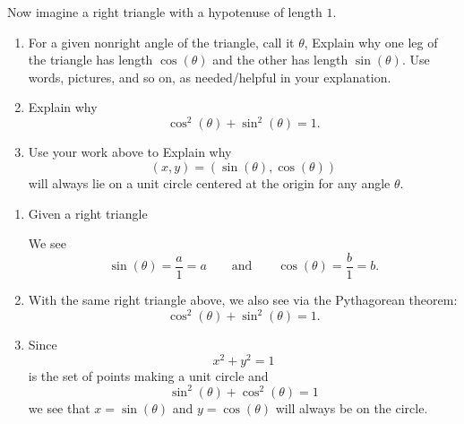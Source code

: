 \documentclass[noauthor,nooutcomes,handout]{ximera}
\begin{document}
\begin{question}
  Now imagine a right triangle with a hypotenuse of length $1$. 
  \begin{enumerate}
  \item For a given nonright angle of the triangle, call it $\theta$,
    Explain why one leg of the triangle has length $\cos(\theta)$ and
    the other has length $\sin(\theta)$.  Use words, pictures, and so
    on, as needed/helpful in your explanation.
  \item Explain why
    \[
    \cos^2(\theta) + \sin^2(\theta) = 1.
    \]
  \item Use your work above to Explain why
    \[
    (x,y) = (\sin(\theta),\cos(\theta))
    \]
    will always lie on a unit circle centered at the origin for any
    angle $\theta$.
  \end{enumerate}
  \begin{freeResponse}
    \begin{enumerate}
    \item Given a right triangle
    \begin{center}
    \end{center}
    We see
    \[
    \sin(\theta) = \frac{a}{1} = a\qquad \text{and}\qquad \cos(\theta) = \frac{b}{1} = b.
    \]
  \item With the same right triangle above, we also see via the Pythagorean theorem:
    \[
    \cos^2(\theta) + \sin^2(\theta) = 1.
    \]
  \item Since
    \[
    x^2+y^2=1
    \]
    is the set of points making a unit circle and
    \[
    \sin^2(\theta) + \cos^2(\theta) = 1
    \]
    we see that $x=\sin(\theta)$ and $y=\cos(\theta)$ will always be
    on the circle.
    \end{enumerate}
  \end{freeResponse}
\end{question}
\mynewpage
\end{document}
